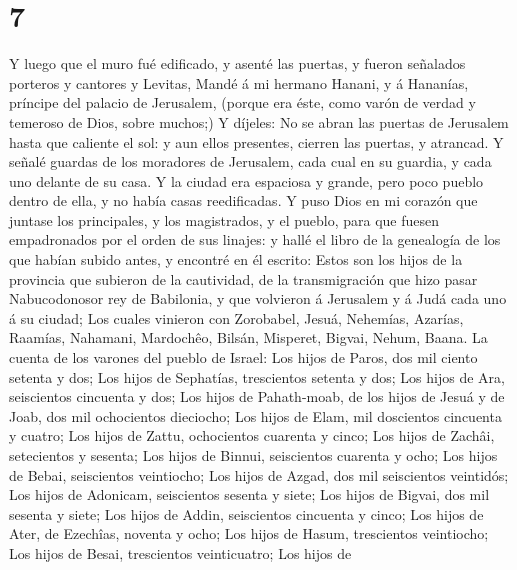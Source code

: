 \hypertarget{section-6}{%
\section{7}\label{section-6}}

 Y luego que el muro fué edificado, y asenté las puertas, y
fueron señalados porteros y cantores y Levitas,  Mandé á mi
hermano Hanani, y á Hananías, príncipe del palacio de Jerusalem, (porque
era éste, como varón de verdad y temeroso de Dios, sobre muchos;)
 Y díjeles: No se abran las puertas de Jerusalem hasta que
caliente el sol: y aun ellos presentes, cierren las puertas, y atrancad.
Y señalé guardas de los moradores de Jerusalem, cada cual en su guardia,
y cada uno delante de su casa.  Y la ciudad era espaciosa y
grande, pero poco pueblo dentro de ella, y no había casas reedificadas.
 Y puso Dios en mi corazón que juntase los principales, y
los magistrados, y el pueblo, para que fuesen empadronados por el orden
de sus linajes: y hallé el libro de la genealogía de los que habían
subido antes, y encontré en él escrito:  Estos son los hijos
de la provincia que subieron de la cautividad, de la transmigración que
hizo pasar Nabucodonosor rey de Babilonia, y que volvieron á Jerusalem y
á Judá cada uno á su ciudad;  Los cuales vinieron con
Zorobabel, Jesuá, Nehemías, Azarías, Raamías, Nahamani, Mardochêo,
Bilsán, Misperet, Bigvai, Nehum, Baana. La cuenta de los varones del
pueblo de Israel:  Los hijos de Paros, dos mil ciento
setenta y dos;  Los hijos de Sephatías, trescientos setenta
y dos;  Los hijos de Ara, seiscientos cincuenta y dos;
 Los hijos de Pahath-moab, de los hijos de Jesuá y de Joab,
dos mil ochocientos dieciocho;  Los hijos de Elam, mil
doscientos cincuenta y cuatro;  Los hijos de Zattu,
ochocientos cuarenta y cinco;  Los hijos de Zachâi,
setecientos y sesenta;  Los hijos de Binnui, seiscientos
cuarenta y ocho;  Los hijos de Bebai, seiscientos
veintiocho;  Los hijos de Azgad, dos mil seiscientos
veintidós;  Los hijos de Adonicam, seiscientos sesenta y
siete;  Los hijos de Bigvai, dos mil sesenta y siete;
 Los hijos de Addin, seiscientos cincuenta y cinco;
 Los hijos de Ater, de Ezechîas, noventa y ocho;
 Los hijos de Hasum, trescientos veintiocho; 
Los hijos de Besai, trescientos veinticuatro;  Los hijos de

